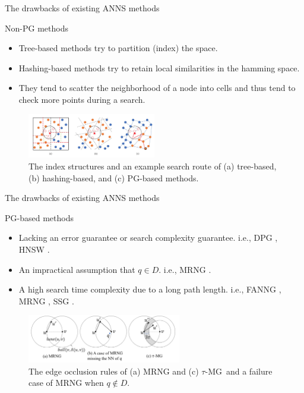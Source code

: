 \documentclass[12pt]{beamer}
\newcommand{\tauMG}{$\tau$-MG\ }
\begin{document}
\begin{frame}{The drawbacks of existing ANNS methods}
  \begin{block}{Non-PG methods}
    \begin{itemize}
      \item Tree-based methods try to partition (index) the space.
      \item Hashing-based methods try to retain local similarities in the hamming space.
      \item They tend to scatter the neighborhood of a node into cells and thus tend to check more points during a search.
    \end{itemize}
  \end{block}

  \begin{figure}
  \includegraphics[width=0.5\textwidth]{Drawback.png}
  \caption{\label{fig:drawbacks} The index structures and an example search route of (a) tree-based, (b) hashing-based, and (c) PG-based methods. \cite{fu_fast_2018}}
  \end{figure}
\end{frame}

\begin{frame}{The drawbacks of existing ANNS methods}
  \begin{block}{PG-based methods}
  \begin{itemize}
    \item Lacking an error guarantee or search complexity guarantee. i.e., DPG \cite{li_approximate_2016}, HNSW \cite{malkov_efficient_2018}.
    \item An impractical assumption that $q \in D$. i.e., MRNG \cite{fu_fast_2018}.
    \item A high search time complexity due to a long path length. i.e., FANNG \cite{harwood_fanng_2016}, MRNG \cite{fu_fast_2018}, SSG \cite{fu_high_2021}.
  \end{itemize}
\end{block}
\begin{figure}
  \includegraphics[width=0.6\textwidth]{qinD.png}
  \caption{\label{fig:qinD} The edge occlusion rules of (a) MRNG and (c) \tauMG and a failure case of MRNG when $q \notin D$. \cite{peng_efficient_2018}}
  \end{figure}
\end{frame}
\end{document}
